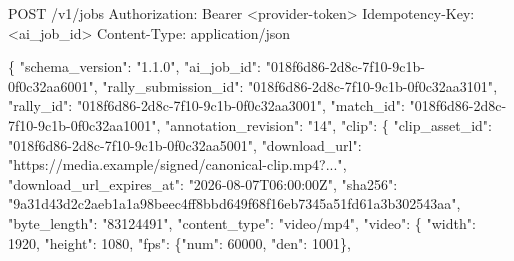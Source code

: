 \documentclass[
  9pt,
  a4paper,
]{article}
\newenvironment{Shaded}{}{}
\newcommand{\DataTypeTok}[1]{\textcolor[rgb]{0.56,0.13,0.00}{#1}}
\newcommand{\DecValTok}[1]{\textcolor[rgb]{0.25,0.63,0.44}{#1}}
\newcommand{\FunctionTok}[1]{\textcolor[rgb]{0.02,0.16,0.49}{#1}}
\newcommand{\NormalTok}[1]{#1}
\newcommand{\StringTok}[1]{\textcolor[rgb]{0.25,0.44,0.63}{#1}}
\begin{document}
\begin{Shaded}
\begin{Highlighting}[]
\NormalTok{POST /v1/jobs}
\NormalTok{Authorization: Bearer \textless{}provider{-}token\textgreater{}}
\NormalTok{Idempotency{-}Key: \textless{}ai\_\allowbreak{}job\_\allowbreak{}id\textgreater{}}
\NormalTok{Content{-}Type: application/json}
\end{Highlighting}
\end{Shaded}

\begin{Shaded}
\begin{Highlighting}[]
\FunctionTok{\{}
  \DataTypeTok{"schema\_\allowbreak{}version"}\FunctionTok{:} \StringTok{"1.1.0"}\FunctionTok{,}
  \DataTypeTok{"ai\_\allowbreak{}job\_\allowbreak{}id"}\FunctionTok{:} \StringTok{"018f6d86{-}2d8c{-}7f10{-}9c1b{-}0f0c32aa6001"}\FunctionTok{,}
  \DataTypeTok{"rally\_\allowbreak{}submission\_\allowbreak{}id"}\FunctionTok{:} \StringTok{"018f6d86{-}2d8c{-}7f10{-}9c1b{-}0f0c32aa3101"}\FunctionTok{,}
  \DataTypeTok{"rally\_\allowbreak{}id"}\FunctionTok{:} \StringTok{"018f6d86{-}2d8c{-}7f10{-}9c1b{-}0f0c32aa3001"}\FunctionTok{,}
  \DataTypeTok{"match\_\allowbreak{}id"}\FunctionTok{:} \StringTok{"018f6d86{-}2d8c{-}7f10{-}9c1b{-}0f0c32aa1001"}\FunctionTok{,}
  \DataTypeTok{"annotation\_\allowbreak{}revision"}\FunctionTok{:} \StringTok{"14"}\FunctionTok{,}
  \DataTypeTok{"clip"}\FunctionTok{:} \FunctionTok{\{}
    \DataTypeTok{"clip\_\allowbreak{}asset\_\allowbreak{}id"}\FunctionTok{:} \StringTok{"018f6d86{-}2d8c{-}7f10{-}9c1b{-}0f0c32aa5001"}\FunctionTok{,}
    \DataTypeTok{"download\_\allowbreak{}url"}\FunctionTok{:} \StringTok{"https://media.example/signed/canonical{-}clip.mp4?..."}\FunctionTok{,}
    \DataTypeTok{"download\_\allowbreak{}url\_\allowbreak{}expires\_\allowbreak{}at"}\FunctionTok{:} \StringTok{"2026{-}08{-}07T06:00:00Z"}\FunctionTok{,}
    \DataTypeTok{"sha256"}\FunctionTok{:} \StringTok{"9a31d43d2c2aeb1a1a98beec4ff8bbd649f68f16eb7345a51fd61a3b302543aa"}\FunctionTok{,}
    \DataTypeTok{"byte\_\allowbreak{}length"}\FunctionTok{:} \StringTok{"83124491"}\FunctionTok{,}
    \DataTypeTok{"content\_\allowbreak{}type"}\FunctionTok{:} \StringTok{"video/mp4"}\FunctionTok{,}
    \DataTypeTok{"video"}\FunctionTok{:} \FunctionTok{\{}
      \DataTypeTok{"width"}\FunctionTok{:} \DecValTok{1920}\FunctionTok{,}
      \DataTypeTok{"height"}\FunctionTok{:} \DecValTok{1080}\FunctionTok{,}
      \DataTypeTok{"fps"}\FunctionTok{:} \FunctionTok{\{}\DataTypeTok{"num"}\FunctionTok{:} \DecValTok{60000}\FunctionTok{,} \DataTypeTok{"den"}\FunctionTok{:} \DecValTok{1001}\FunctionTok{\},}

\end{Highlighting}
\end{Shaded}
\end{document}
